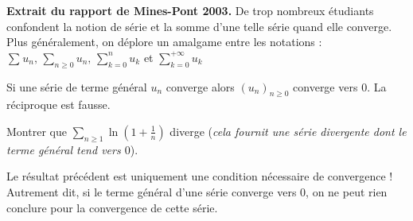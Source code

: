 \documentclass[a4paper,10pt]{report}
\newcommand{\Sum}[2]{\ensuremath{\textstyle{\sum\limits_{#1}^{#2}}}}
\begin{document}
\noindent \textbf{Extrait du rapport de Mines-Pont 2003.} \og De trop nombreux étudiants confondent la notion de série et la somme d'une telle série quand elle converge.  Plus généralement, on déplore un amalgame entre les notations : $\Sum{}{} u_n, \,  \Sum{n \geq 0}{} u_n,  \, \Sum{k = 0}{n} u_k$ et $\Sum{k =0}{+ \infty} u_k$ \fg 

\medskip


\begin{thm} Si une série de terme général $u_n$ converge alors $(u_n)_{n \geq 0}$ converge vers $0$. La réciproque est fausse. \end{thm}

\begin{preuve} 

\vspace{4cm}
%
%
\end{preuve}

\begin{exa} Montrer que $\Sum{n\geq 1}{} \ln \left(1 + \frac{1}{n} \right)$ diverge (\textit{cela fournit une série divergente dont le terme général tend vers $0$}).
\end{exa}


\begin{att} Le résultat précédent est uniquement une condition nécessaire de convergence ! Autrement dit, si le terme général d'une série converge vers $0$, on ne peut rien conclure pour la convergence de cette série. 
\end{att}
\end{document}
